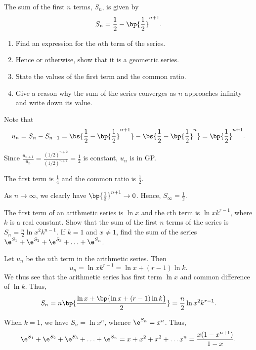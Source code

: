 \begin{problem}
    The sum of the first $n$ terms, $S_n$, is given by \[S_n = \frac12 - \bp{\frac12}^{n+1}.\]
    
    \begin{enumerate}
        \item Find an expression for the $n$th term of the series.
        \item Hence or otherwise, show that it is a geometric series.
        \item State the values of the first term and the common ratio.
        \item Give a reason why the sum of the series converges as $n$ approaches infinity and write down its value.
    \end{enumerate}
\end{problem}
\begin{solution}
    \begin{ppart}
        Note that \[u_n = S_n - S_{n-1} = \bs{\frac12 - \bp{\frac12}^{n+1}} - \bs{\frac12 - \bp{\frac12}^{n}} = \bp{\frac12}^{n+1}.\]
    \end{ppart}
    \begin{ppart}
        Since $\frac{u_{n+1}}{u_n} = \frac{(1/2)^{n+2}}{(1/2)^{n+1}} = \frac12$ is constant, $u_n$ is in GP.
    \end{ppart}
    \begin{ppart}
        The first term is $\frac14$ and the common ratio is $\frac12$.
    \end{ppart}
    \begin{ppart}
        As $n \to \infty$, we clearly have $\bp{\frac12}^{n+1} \to 0$. Hence, $S_\infty = \frac12$.
    \end{ppart}
\end{solution}

\begin{problem}
    The first term of an arithmetic series is $\ln x$ and the $r$th term is $\ln{xk^{r-1}}$, where $k$ is a real constant. Show that the sum of the first $n$ terms of the series is $S_n = \frac{n}2 \ln{x^2k^{n-1}}$. If $k = 1$ and $x \neq 1$, find the sum of the series $\e^{S_1} + \e^{S_2} + \e^{S_3} + \ldots + \e^{S_n}$.
\end{problem}
\begin{solution}
    Let $u_n$ be the $n$th term in the arithmetic series. Then \[u_n = \ln{xk^{r-1}} = \ln x + (r-1)\ln k.\] We thus see that the arithmetic series has first term $\ln x$ and common difference of $\ln k$. Thus, \[S_n = n\bp{\frac{\ln x + \bp{\ln x + (r-1)\ln k}}{2}} = \frac{n}{2} \ln{x^2 k^{r-1}}.\]

    When $k = 1$, we have $S_n = \ln{x^n}$, whence $\e^{S_n} = x^n$. Thus, \[\e^{S_1} + \e^{S_2} + \e^{S_3} + \ldots + \e^{S_n} = x + x^2 + x^3 + \ldots x^n = \frac{x(1-x^{n+1})}{1-x}.\]
\end{solution}

